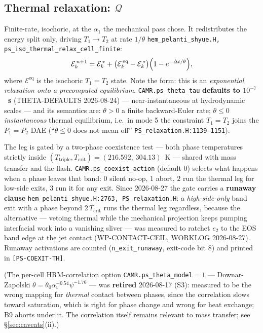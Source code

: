 \documentclass[11pt,a4paper]{article}
\newcommand{\code}[1]{\texttt{\small #1}}
\newcommand{\src}[1]{{\color{gray}\code{#1}}}
\begin{document}
\subsection{Thermal relaxation: $\mathcal{Q}$}

Finite-rate, isochoric, at the $\alpha_1$ the mechanical pass chose.  It
redistributes the energy split only, driving $T_1\!\to\!T_2$ at rate
$1/\theta$ \src{hem\_pelanti\_shyue.H, ps\_iso\_thermal\_relax\_cell\_finite}:
\begin{equation}
  \mathcal{E}_k^{\,n+1}
    = \mathcal{E}_k^{\,*}
    + \bigl(\mathcal{E}_k^{\,\mathrm{eq}}-\mathcal{E}_k^{\,*}\bigr)
      \Bigl(1-e^{-\Delta t/\theta}\Bigr),
  \label{eq:thermal}
\end{equation}
where $\mathcal{E}^{\mathrm{eq}}$ is the isochoric $T_1\!=\!T_2$ state.  Note
the form: this is an \emph{exponential relaxation onto a precomputed
equilibrium}.  \code{CAMR.ps\_theta\_tau} \textbf{defaults to
$10^{-7}$~s} (THETA-DEFAULTS 2026-08-24) --- near-instantaneous at
hydrodynamic scales --- and its semantics are: $\theta>0$ a finite
backward-Euler rate; $\theta\le0$ \emph{instantaneous} thermal
equilibrium, i.e.\ in mode 5 the constraint $T_1\!=\!T_2$ joins the
$P_1\!=\!P_2$ DAE (``$\theta\le0$ does not mean off''
\src{PS\_relaxation.H:1139--1151}).

The leg is gated by a two-phase coexistence test --- both phase temperatures
strictly inside $(T_{\mathrm{triple}},T_{\mathrm{crit}}) = (216.592,\,304.13)$~K
--- shared with mass transfer and the flash.  \code{CAMR.ps\_coexist\_action}
(default $0$) selects what happens when a phase leaves that band: $0$ silent
no-op, $1$ abort, $2$ run the thermal leg for low-side exits, $3$ run it for
any exit.  Since 2026-08-27 the gate carries a \textbf{runaway clause}
\src{hem\_pelanti\_shyue.H:2763, PS\_relaxation.H}: a \emph{high-side-only}
band exit with a phase beyond $2\,T_{\mathrm{crit}}$ runs the thermal leg
regardless, because the alternative --- vetoing thermal while the mechanical
projection keeps pumping interfacial work into a vanishing sliver --- was
measured to ratchet $e_2$ to the EOS band edge at the jet contact
(WP-CONTACT-CEIL, WORKLOG 2026-08-27).  Runaway activations are counted
(\code{n\_exit\_runaway}, exit-code bit 8) and printed in
\code{[PS-COEXIT-TH]}.

(The per-cell HRM-correlation option \code{CAMR.ps\_theta\_model}$=1$ ---
Downar-Zapolski $\theta=\theta_0\alpha_v^{-0.54}\psi^{-1.76}$ --- was
\textbf{retired} 2026-08-17 (S3): measured to be the wrong mapping for
\emph{thermal} contact between phases, since the correlation slows toward
saturation, which is right for phase change and wrong for heat exchange;
B9 aborts under it.  The correlation itself remains relevant to mass
transfer; see \S\ref{sec:caveats}(ii).)
\end{document}
